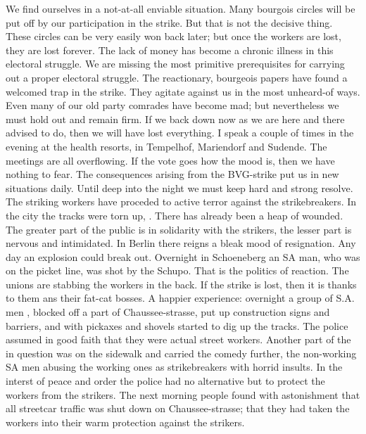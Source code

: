 We find ourselves in a not-at-all enviable situation. Many bourgois circles will be put off by our participation in the strike. But that is not the decisive thing. These circles can be very easily won back later; but once the workers are lost, they are lost forever. The lack of money has become a chronic illness in this electoral struggle. We are missing the most primitive prerequisites for carrying out a proper electoral struggle. The reactionary, bourgeois papers have found a welcomed trap in the strike. They agitate against us in the most unheard-of ways. Even many of our old party comrades have become mad; but nevertheless we must hold out and remain firm. If we back down now as we are here and there advised to do, then we will have lost everything. I speak a couple of times in the evening at the health resorts, in Tempelhof, Mariendorf and Sudende. The meetings are all overflowing. If the vote goes how the mood is, then we have nothing to fear. The consequences arising from the BVG-strike put us in new situations daily. Until deep into the night we must keep hard and strong resolve. The striking workers have proceded to active terror against the strikebreakers. In the city the tracks were torn up, . There has already been a heap of wounded. The greater part of the public is in solidarity with the strikers, the lesser part is nervous and intimidated. In Berlin there reigns a bleak mood of resignation. Any day an explosion could break out. Overnight in Schoeneberg an SA man, who was on the picket line, was shot by the Schupo. That is the politics of reaction. The unions are stabbing the workers in the back. If the strike is lost, then it is thanks to them ans their fat-cat bosses. A happier experience: overnight a group of S.A. men , blocked off a part of Chaussee-strasse, put up construction signs and barriers, and with pickaxes and shovels started to dig up the tracks. The police assumed in good faith that they were actual street workers. Another part of the  in question was on the sidewalk and carried the comedy further, the non-working SA men abusing the working ones as strikebreakers with horrid insults. In the interst of peace and order the police had no alternative but to protect the workers from the strikers. The next morning people found with astonishment that all streetcar traffic was shut down on Chaussee-strasse;  that they had taken the workers into their warm protection against the strikers.

